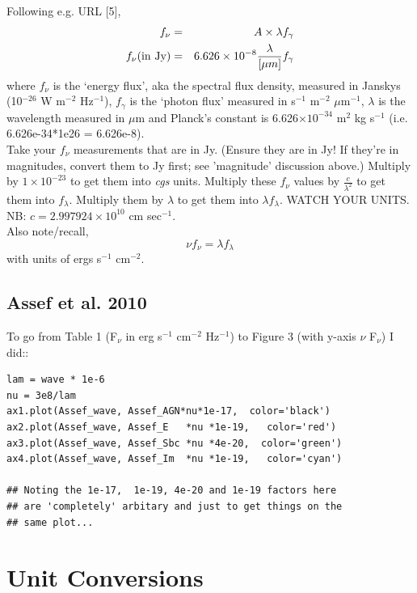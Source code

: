 \documentclass[11pt,a4paper]{article}
\begin{document}
\noindent
Following e.g. URL [5], 
\begin{eqnarray}
f_{\nu}                      & = & A \times \lambda f_{\gamma}\\
f_{\nu} {\rm (in\ Jy)} & = & 6.626\times10^{-8} \frac{\lambda}{[\mu m]} f_{\gamma}\\
\end{eqnarray}
where $f_{\nu}$ is the `energy flux', aka the spectral flux density,
measured in Janskys (10$^{-26}$ W m$^{-2}$ Hz$^{-1}$), $f_{\gamma}$ is
the `photon flux' measured in s$^{-1}$ m$^{-2}$ $\mu$m$^{-1}$,
$\lambda$ is the wavelength measured in $\mu$m and Planck's constant
is 6.626$\times10^{-34}$ m$^{2}$ kg s$^{-1}$ (i.e. 6.626e-34*1e26 =
6.626e-8).\\

\noindent
Take your $f_{\nu}$ measurements that are in Jy. (Ensure they are in
Jy! If they're in magnitudes, convert them to Jy first; see
'magnitude' discussion above.) Multiply by $1\times10^{-23}$ to get
them into {\it cgs} units. Multiply these $f_{\nu}$ values by
$\frac{c}{\lambda^{2}}$ to get them into $f_{\lambda}$. Multiply them
by $\lambda$ to get them into $\lambda f_{\lambda}$. WATCH YOUR
UNITS. NB: $c = 2.997924\times10^{10}$ cm sec$^{-1}$. \\

\noindent
Also note/recall, 
\begin{equation}
  \nu  f_{\nu}    =  \lambda  f_{\lambda}
\end{equation}
with units of ergs s$^{-1}$ cm$^{-2}$. 

\subsection{Assef et al. 2010}
To go from Table 1 (F$_{\nu}$ in erg s$^{-1}$ cm$^{-2}$ Hz$^{-1}$) to Figure 3 (with y-axis $\nu$ F$_{\nu}$) I did:: 

\begin{lstlisting}
lam = wave * 1e-6
nu = 3e8/lam
ax1.plot(Assef_wave, Assef_AGN*nu*1e-17,  color='black')
ax2.plot(Assef_wave, Assef_E   *nu *1e-19,   color='red')
ax3.plot(Assef_wave, Assef_Sbc *nu *4e-20,  color='green')
ax4.plot(Assef_wave, Assef_Im  *nu *1e-19,   color='cyan')

## Noting the 1e-17,  1e-19, 4e-20 and 1e-19 factors here 
## are 'completely' arbitary and just to get things on the 
## same plot...
\end{lstlisting}


\section{Unit Conversions}
\end{document}
